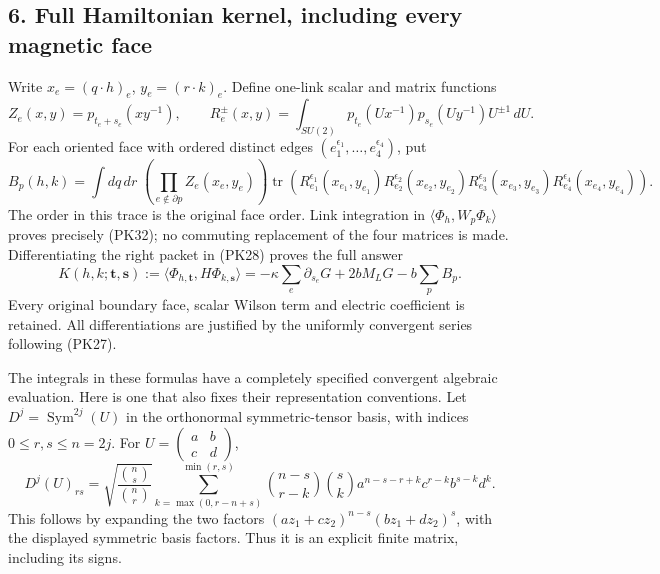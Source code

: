 \documentclass[11pt]{article}
\begin{document}
\subsection*{6. Full Hamiltonian kernel, including every magnetic face}

Write \(x_e=(q\cdot h)_e\), \(y_e=(r\cdot k)_e\). Define one-link
scalar and matrix functions
\[
 Z_e(x,y)=p_{t_e+s_e}(xy^{-1}),\qquad
 R_e^{\pm}(x,y)=\int_{SU(2)}p_{t_e}(Ux^{-1})p_{s_e}(Uy^{-1})U^{\pm1}\,dU.
 \tag{PK31}
\]
For each oriented face with ordered distinct edges
\((e_1^{\epsilon_1},\ldots,e_4^{\epsilon_4})\), put
\[
 B_p(h,k)=\int dq\,dr\;
 \left(\prod_{e\notin\partial p}Z_e(x_e,y_e)\right)
 \operatorname{tr}\left(
 R_{e_1}^{\epsilon_1}(x_{e_1},y_{e_1})
 R_{e_2}^{\epsilon_2}(x_{e_2},y_{e_2})
 R_{e_3}^{\epsilon_3}(x_{e_3},y_{e_3})
 R_{e_4}^{\epsilon_4}(x_{e_4},y_{e_4})\right).
 \tag{PK32}
\]
The order in this trace is the original face order. Link integration in
\(\langle\Phi_h,W_p\Phi_k\rangle\) proves precisely (PK32); no
commuting replacement of the four matrices is made. Differentiating the
right packet in (PK28) proves the full answer
\[
 K(h,k;\mathbf t,\mathbf s)
 :=\langle\Phi_{h,\mathbf t},H\Phi_{k,\mathbf s}\rangle
 =-\kappa\sum_e\partial_{s_e}G
       +2bM_LG-b\sum_pB_p.
 \tag{PK33}
\]
Every original boundary face, scalar Wilson term and electric coefficient
is retained. All differentiations are justified by the uniformly
convergent series following (PK27).

The integrals in these formulas have a completely specified convergent
algebraic evaluation. Here is one that also fixes their representation
conventions. Let \(D^j=\operatorname{Sym}^{2j}(U)\) in the orthonormal
symmetric-tensor basis, with indices \(0\le r,s\le n=2j\). For
\(U=\left(\begin{smallmatrix}a&b\\c&d\end{smallmatrix}\right)\),
\[
 D^j(U)_{rs}=\sqrt{\frac{\binom ns}{\binom nr}}
 \sum_{k=\max(0,r-n+s)}^{\min(r,s)}
 \binom{n-s}{r-k}\binom sk
 a^{n-s-r+k}c^{r-k}b^{s-k}d^k.
 \tag{PK34}
\]
This follows by expanding the two factors
\((az_1+cz_2)^{n-s}(bz_1+dz_2)^s\), with the displayed symmetric
basis factors. Thus it is an explicit finite matrix, including its signs.
\end{document}
